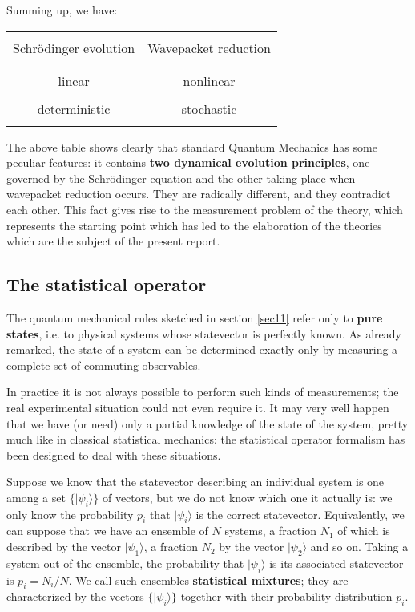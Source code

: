 \documentclass[12pt]{article}
\begin{document}
Summing up, we have: \vspace{0.5cm}

\begin{center}
\begin{tabular}{|c|c|} \hline
& \\
Schr\"odinger evolution & Wavepacket reduction \\
& \\ \hline
& \\
linear & nonlinear \\
& \\
deterministic & stochastic \\
& \\ \hline
\end{tabular}
\end{center}
\vspace{0.5cm}

\noindent The above table shows clearly that standard Quantum
Mechanics has some peculiar features: it contains {\bf two
dynamical evolution principles}, one governed by the Schr\"odinger
equation and the other taking place when wavepacket reduction
occurs. They are radically different, and they contradict each
other. This fact gives rise to the measurement problem of the
theory, which represents the starting point which has led to the
elaboration of the theories which are the subject of the present
report.


\subsection{The statistical operator} \label{sec13}

The quantum mechanical rules sketched in section \ref{sec11} refer
only to {\bf pure states}, i.e. to physical systems whose
statevector is perfectly known. As already remarked, the state of
a system can be determined exactly only by measuring a complete
set of commuting observables.

In practice  it is not always possible to perform such kinds of
measurements; the real experimental situation could not even
require it. It may very well happen that we have (or need) only a
partial knowledge of the state of the system, pretty much like in
classical statistical mechanics: the statistical operator
formalism has been designed to deal with these situations.

Suppose we know that the statevector describing an individual
system is one among a set $\{|\psi_{i}\rangle\}$ of vectors, but
we do not know which one it actually is: we only know the
probability $p_{i}$ that $|\psi_{i}\rangle$ is the correct
statevector. Equivalently, we can suppose that we have an ensemble
of $N$ systems, a fraction $N_{1}$ of which is described by the
vector $|\psi_{1}\rangle$, a fraction $N_{2}$ by the vector
$|\psi_{2}\rangle$ and so on. Taking a system out of the ensemble,
the probability that $|\psi_{i}\rangle$ is its associated
statevector is $p_{i} = N_{i}/N$. We call such ensembles {\bf
statistical mixtures}; they are characterized by the vectors
$\{|\psi_{i}\rangle\}$ together with their probability
distribution $p_{i}$.
\end{document}
